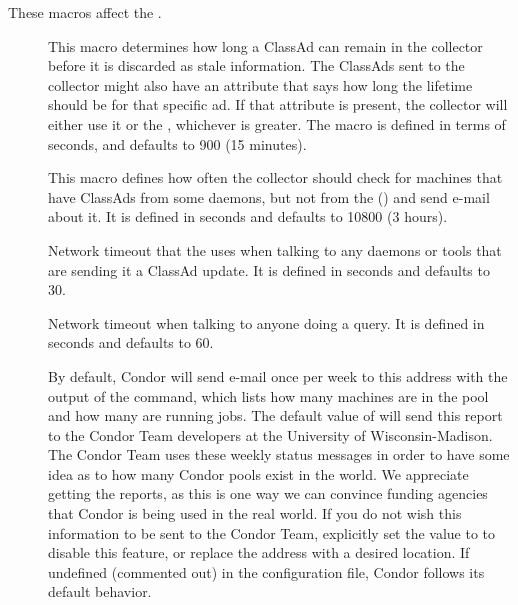 These macros affect the .
\begin{description}
  
\item[] \label{param:ClassadLifetime} This
  macro determines how long a ClassAd can remain in the collector
  before it is discarded as stale information.  The ClassAds sent to
  the collector might also have an attribute that says how long the
  lifetime should be for that specific ad.  If that attribute is
  present, the collector will either use it or the
  , whichever is greater.  The macro is
  defined in terms of seconds, and defaults to 900 (15 minutes).
  
\item[]
  \label{param:MasterCheckInterval}  This macro defines how often the
  collector should check for machines that have ClassAds from some
  daemons, but not from the  ()
  and send e-mail about it.  It is defined in seconds and 
  defaults to 10800 (3 hours).

\item[] \label{param:ClientTimeout} Network
  timeout that the  uses when talking to any daemons
  or tools that are sending it a ClassAd update.
  It is defined in seconds and defaults to 30.
  
\item[] \label{param:QueryTimeout} Network
  timeout when talking to anyone doing a query. It is defined in seconds
  and defaults to 60.
  
\item[] \label{param:CondorDevelopers}
  By default,
  Condor will send e-mail once per week to this address with the output
  of the  command, which lists how many machines
  are in the pool and how many are running jobs.  The default
  value of  will send this report to
  the Condor Team developers at the University of Wisconsin-Madison.
  The Condor Team uses
  these weekly status messages in order to have some idea as to how
  many Condor pools exist in the world.  We appreciate
  getting the reports, as this is one way we can convince funding
  agencies that Condor is being used in the real world.  
  If you do not wish this information to be sent to the Condor Team,
  explicitly set the value to  to disable this feature,
  or replace the
  address with a desired location.  
  If undefined (commented out) in the configuration file, Condor follows
  its default behavior.


\end{description}
